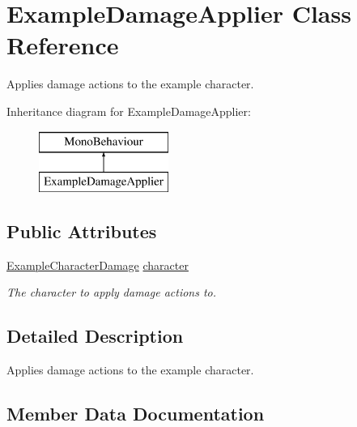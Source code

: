 \hypertarget{class_example_damage_applier}{}\section{Example\+Damage\+Applier Class Reference}
\label{class_example_damage_applier}


Applies damage actions to the example character.  


Inheritance diagram for Example\+Damage\+Applier\+:\begin{figure}[H]
\begin{center}
\leavevmode
\includegraphics[height=2.000000cm]{class_example_damage_applier}
\end{center}
\end{figure}
\subsection*{Public Attributes}
\begin{DoxyCompactItemize}
\item 
\hyperlink{class_example_character_damage}{Example\+Character\+Damage} \hyperlink{class_example_damage_applier_a1275e973ce691cf54b0f3e5c1fa90007}{character}
\begin{DoxyCompactList}\small\item\em The character to apply damage actions to. \end{DoxyCompactList}\end{DoxyCompactItemize}


\subsection{Detailed Description}
Applies damage actions to the example character. 



\subsection{Member Data Documentation}
\hypertarget{class_example_damage_applier_a1275e973ce691cf54b0f3e5c1fa90007}{}
